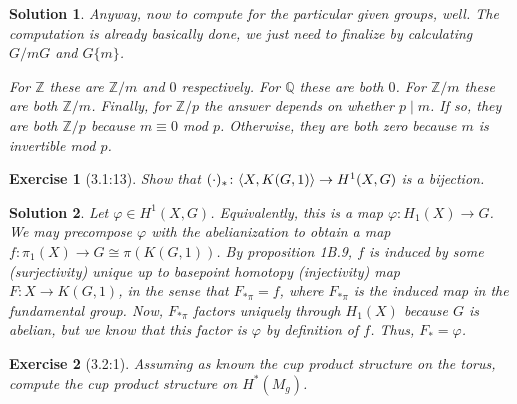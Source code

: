 \documentclass{article}
\theoremstyle{plain}
\newtheorem*{ex}{Exercise}
\theoremstyle{nonumberplain}
\newtheorem{sol}{Solution}
\newcommand{\Z}{\mathbb{Z}}
\newcommand{\Q}{\mathbb{Q}}
\DeclarePairedDelimiter{\braket}{\langle}{\rangle}
\begin{document}
\begin{sol}
Anyway, now to compute for the particular given groups, well. The computation is already basically done, we just need to finalize by calculating $G/mG$ and $G\{m\}$.

For $\Z$ these are $\Z/m$ and $0$ respectively. For $\Q$ these are both $0$. For $\Z/m$ these are both $\Z/m$. Finally, for $\Z/p$ the answer depends on whether $p \mid m$. If so, they are both $\Z/p$ because $m \equiv 0$ mod $p$. Otherwise, they are both zero because $m$ is invertible mod $p$.
\end{sol}

\begin{ex}[3.1:13]
Show that $( \cdot )_* \colon \braket{X,K(G,1)} \to H^1(X,G)$ is a bijection.
\end{ex}

\begin{sol}
Let $\varphi \in H^1(X,G)$. Equivalently, this is a map $\varphi \colon H_1(X) \to G$. We may precompose $\varphi$ with the abelianization to obtain a map $f \colon \pi_1(X) \to G \cong \pi(K(G,1))$. By proposition 1B.9, $f$ is induced by some (surjectivity) unique up to basepoint homotopy (injectivity) map $F \colon X \to K(G,1)$, in the sense that $F_{*\pi} = f$, where $F_{*\pi}$ is the induced map in the fundamental group. Now, $F_{*\pi}$ factors uniquely through $H_1(X)$ because $G$ is abelian, but we know that this factor is $\varphi$ by definition of $f$. Thus, $F_* = \varphi$.
\end{sol}

\begin{ex}[3.2:1]
Assuming as known the cup product structure on the torus, compute the cup product structure on $H^*(M_g)$.
\end{ex}
\end{document}
